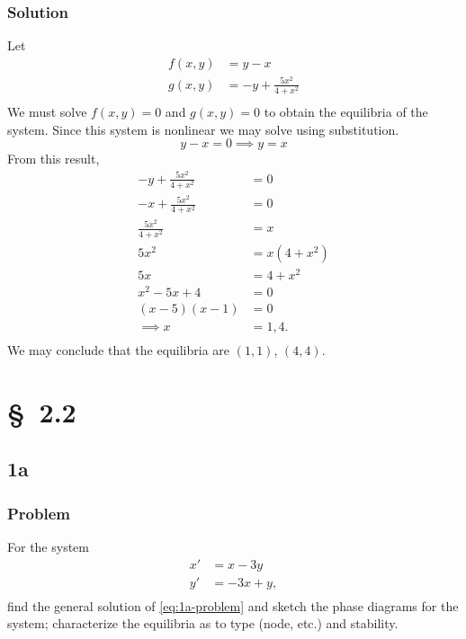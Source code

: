 \documentclass[12pt]{article}
\begin{document}
\subsubsection*{Solution}
Let
\begin{equation}
  \begin{aligned}
    f(x,y) &= y-x \\
    g(x,y) &= -y+\frac{5x^2}{4+x^2} \\
  \end{aligned}
\end{equation}
We must solve $f(x,y)=0$ and $g(x,y)=0$ to obtain the equilibria of the system.
Since this system is nonlinear we may solve using substitution.
\begin{equation}
  y - x = 0 \implies y = x
\end{equation}
From this result,
\begin{equation}
  \begin{aligned}
    -y+\frac{5x^2}{4+x^2} &= 0 \\
    -x+\frac{5x^2}{4+x^2} &= 0 \\
    \frac{5x^2}{4+x^2} &= x \\
    5x^2 &= x(4+x^2) \\
    5x &= 4+x^2 \\
    x^2-5x+4 &= 0 \\
    (x-5)(x-1) &= 0 \\
    \implies x &= 1, 4. \\
  \end{aligned}
\end{equation}
We may conclude that the equilibria are $(1,1)$, $(4,4)$.
\section{\S~2.2}
\subsection{1a}
\subsubsection*{Problem}
For the system
\begin{equation}
  \label{eq:1a-problem}
  \begin{aligned}
    x'&=x-3y\\
    y'&=-3x+y,\\
  \end{aligned}
\end{equation}
find the general solution of \cref{eq:1a-problem} and sketch the phase diagrams
for the system; characterize the equilibria as to type (node, etc.) and
stability.
\end{document}

